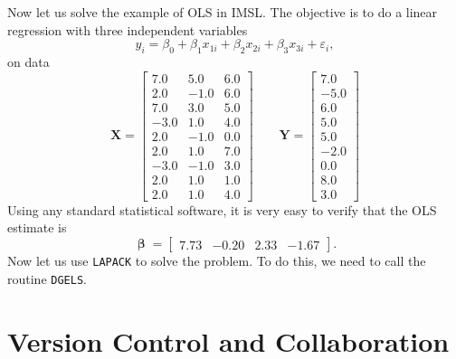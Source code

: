 \documentclass[twoside,11pt,leqno]{article}
\renewcommand{\vec}[1]{\ensuremath{\mathbf{#1}}}
\newcommand{\gvec}[1]{{\boldsymbol{#1}}}
\newcommand{\code}{\texttt}
\begin{document}
Now let us solve the example of OLS in IMSL. The objective is to do a linear regression with three independent variables
\begin{equation*}
    y_i = \beta_0 + \beta_1 x_{1i} + \beta_2 x_{2i} + \beta_3 x_{3i} + \varepsilon_i,
\end{equation*}
on data
\begin{equation*}
    \vec{X} = \begin{bmatrix}
        7.0  & 5.0  & 6.0 \\
        2.0  & -1.0 & 6.0 \\
        7.0  & 3.0  & 5.0 \\
        -3.0 & 1.0  & 4.0 \\
        2.0  & -1.0 & 0.0 \\
        2.0  & 1.0  & 7.0 \\
        -3.0 & -1.0 & 3.0 \\
        2.0  & 1.0  & 1.0 \\   
        2.0  & 1.0  & 4.0 \end{bmatrix} \qquad 
    \vec{Y} = \begin{bmatrix}
        7.0 \\ -5.0 \\ 6.0 \\ 5.0 \\ 5.0 \\ -2.0 \\ 0.0 \\ 8.0 \\ 3.0 \end{bmatrix}    
\end{equation*}
Using any standard statistical software, it is very easy to verify that the OLS estimate is
\begin{equation*}
    \gvec{\upbeta} = \begin{bmatrix} 7.73 & -0.20 & 2.33 & -1.67 \end{bmatrix}.
\end{equation*}
Now let us use \code{LAPACK} to solve the problem. To do this, we need to call the routine \code{DGELS}.

\section{Version Control and Collaboration}
\end{document}
